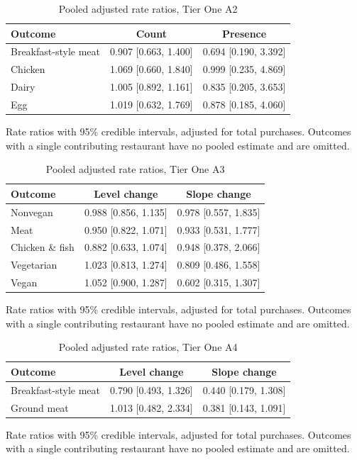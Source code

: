 \begin{table}[H]
\centering
\caption{Pooled adjusted rate ratios, Tier One A2}
\label{tab:rr_t1_a2}
\begin{tabular}{lcc}
\toprule
Outcome & Count & Presence \\
\midrule
Breakfast-style meat & 0.907 [0.663, 1.400] & 0.694 [0.190, 3.392] \\
Chicken & 1.069 [0.660, 1.840] & 0.999 [0.235, 4.869] \\
Dairy & 1.005 [0.892, 1.161] & 0.835 [0.205, 3.653] \\
Egg & 1.019 [0.632, 1.769] & 0.878 [0.185, 4.060] \\
\bottomrule
\end{tabular}
\par\smallskip\footnotesize Rate ratios with 95\% credible intervals, adjusted for total purchases. Outcomes with a single contributing restaurant have no pooled estimate and are omitted.
\end{table}

\begin{table}[H]
\centering
\caption{Pooled adjusted rate ratios, Tier One A3}
\label{tab:rr_t1_a3}
\begin{tabular}{lcc}
\toprule
Outcome & Level change & Slope change \\
\midrule
Nonvegan & 0.988 [0.856, 1.135] & 0.978 [0.557, 1.835] \\
Meat & 0.950 [0.822, 1.071] & 0.933 [0.531, 1.777] \\
Chicken \& fish & 0.882 [0.633, 1.074] & 0.948 [0.378, 2.066] \\
Vegetarian & 1.023 [0.813, 1.274] & 0.809 [0.486, 1.558] \\
Vegan & 1.052 [0.900, 1.287] & 0.602 [0.315, 1.307] \\
\bottomrule
\end{tabular}
\par\smallskip\footnotesize Rate ratios with 95\% credible intervals, adjusted for total purchases. Outcomes with a single contributing restaurant have no pooled estimate and are omitted.
\end{table}

\begin{table}[H]
\centering
\caption{Pooled adjusted rate ratios, Tier One A4}
\label{tab:rr_t1_a4}
\begin{tabular}{lcc}
\toprule
Outcome & Level change & Slope change \\
\midrule
Breakfast-style meat & 0.790 [0.493, 1.326] & 0.440 [0.179, 1.308] \\
Ground meat & 1.013 [0.482, 2.334] & 0.381 [0.143, 1.091] \\
\bottomrule
\end{tabular}
\par\smallskip\footnotesize Rate ratios with 95\% credible intervals, adjusted for total purchases. Outcomes with a single contributing restaurant have no pooled estimate and are omitted.
\end{table}

